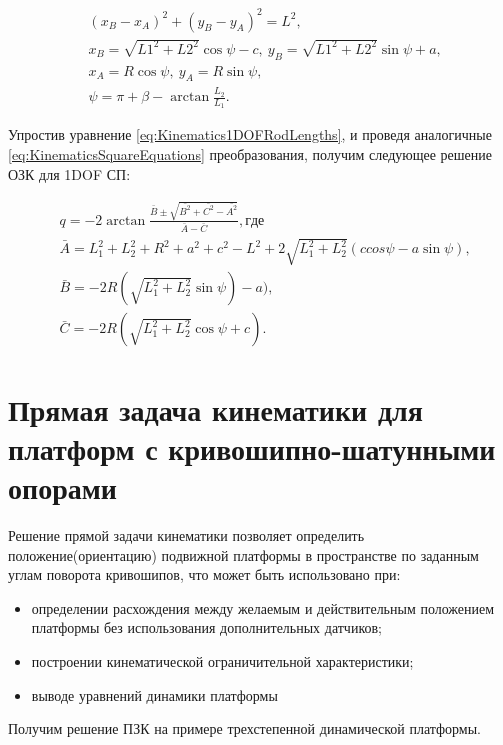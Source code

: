 \begin{equation}
\label{eq:Kinematics1DOFRodLengths}
\begin{aligned}
	& \left(x_B-x_A\right)^2 + \left(y_B-y_A\right)^2 = L^2,\\
	& x_B = \sqrt{L1^2 + L2^2}\cos{\psi} - c,~y_B = \sqrt{L1^2 + L2^2}\sin{\psi} + a,\\
	& x_A = R\cos{\psi},~y_A = R\sin{\psi},\\
	& \psi = \pi+\beta-\arctan{\frac{L_2}{L_1}}.
\end{aligned}
\end{equation}

Упростив уравнение \ref{eq:Kinematics1DOFRodLengths}, и проведя аналогичные \ref{eq:KinematicsSquareEquations} преобразования, получим следующее решение ОЗК для 1DOF СП:

\begin{equation}
\label{eq:Kinematics1DOFSolution}
\begin{aligned}
	& q = -2\arctan\frac{\bar{B}\pm\sqrt{\bar{B^2} + \bar{C^2} - \bar{A^2}}}{\bar{A} - \bar{C}}, где \\
	& \bar{A} = L_1^2 + L_2^2 + R^2 + a^2 + c^2 - L^2 + 2\sqrt{L_1^2 + L_2^2}\left(ccos{\psi}-a\sin{\psi}\right),\\
	& \bar{B} = -2R\left(\sqrt{L_1^2 + L_2^2}\sin{\psi}\right) - a),\\
	& \bar{C} = -2R\left(\sqrt{L_1^2 + L_2^2}\cos{\psi} + c\right).
\end{aligned}
\end{equation}

\section{Прямая задача кинематики для платформ с кривошипно-шатунными опорами}
Решение прямой задачи кинематики позволяет определить положение(ориентацию) подвижной платформы в пространстве по заданным углам поворота кривошипов, что может быть использовано при:
\begin{itemize}
\item определении расхождения между желаемым и действительным положением платформы без использования дополнительных датчиков;
\item построении кинематической ограничительной характеристики;
\item выводе уравнений динамики платформы
\end{itemize}
Получим решение ПЗК на примере трехстепенной динамической платформы.

